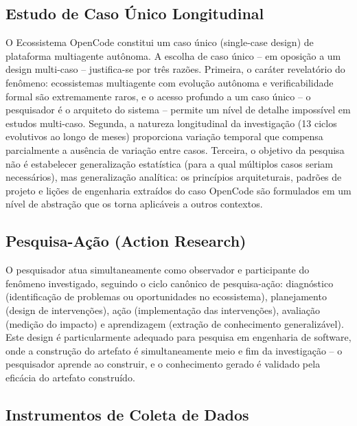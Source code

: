\documentclass[12pt,a4paper,sumario=tradicional,openany]{abntex2}
\begin{document}
\subsection{Estudo de Caso Único Longitudinal}

O Ecossistema OpenCode constitui um caso único (single-case design) de plataforma multiagente autônoma. A escolha de caso único -- em oposição a um design multi-caso -- justifica-se por três razões. Primeira, o caráter revelatório do fenômeno: ecossistemas multiagente com evolução autônoma e verificabilidade formal são extremamente raros, e o acesso profundo a um caso único -- o pesquisador é o arquiteto do sistema -- permite um nível de detalhe impossível em estudos multi-caso. Segunda, a natureza longitudinal da investigação (13 ciclos evolutivos ao longo de meses) proporciona variação temporal que compensa parcialmente a ausência de variação entre casos. Terceira, o objetivo da pesquisa não é estabelecer generalização estatística (para a qual múltiplos casos seriam necessários), mas generalização analítica: os princípios arquiteturais, padrões de projeto e lições de engenharia extraídos do caso OpenCode são formulados em um nível de abstração que os torna aplicáveis a outros contextos.

\subsection{Pesquisa-Ação (Action Research)}

O pesquisador atua simultaneamente como observador e participante do fenômeno investigado, seguindo o ciclo canônico de pesquisa-ação: diagnóstico (identificação de problemas ou oportunidades no ecossistema), planejamento (design de intervenções), ação (implementação das intervenções), avaliação (medição do impacto) e aprendizagem (extração de conhecimento generalizável). Este design é particularmente adequado para pesquisa em engenharia de software, onde a construção do artefato é simultaneamente meio e fim da investigação -- o pesquisador aprende ao construir, e o conhecimento gerado é validado pela eficácia do artefato construído.

\subsection{Instrumentos de Coleta de Dados}
\end{document}
